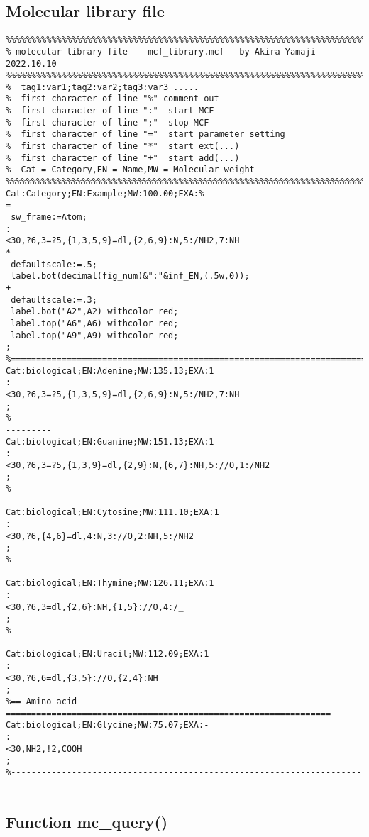 \documentclass[a4paper]{article}
\begin{document}
\subsection{Molecular library file}
\begin{verbatim}
%%%%%%%%%%%%%%%%%%%%%%%%%%%%%%%%%%%%%%%%%%%%%%%%%%%%%%%%%%%%%%%%%%%%%%%%%%%%%%%
% molecular library file    mcf_library.mcf   by Akira Yamaji   2022.10.10
%%%%%%%%%%%%%%%%%%%%%%%%%%%%%%%%%%%%%%%%%%%%%%%%%%%%%%%%%%%%%%%%%%%%%%%%%%%%%%%
%  tag1:var1;tag2:var2;tag3:var3 .....
%  first character of line "%" comment out
%  first character of line ":"  start MCF
%  first character of line ";"  stop MCF
%  first character of line "="  start parameter setting
%  first character of line "*"  start ext(...)
%  first character of line "+"  start add(...)
%  Cat = Category,EN = Name,MW = Molecular weight
%%%%%%%%%%%%%%%%%%%%%%%%%%%%%%%%%%%%%%%%%%%%%%%%%%%%%%%%%%%%%%%%%%%%%%%%%%%%%%%
Cat:Category;EN:Example;MW:100.00;EXA:%
=
 sw_frame:=Atom;
:
<30,?6,3=?5,{1,3,5,9}=dl,{2,6,9}:N,5:/NH2,7:NH
*
 defaultscale:=.5;
 label.bot(decimal(fig_num)&":"&inf_EN,(.5w,0));
+
 defaultscale:=.3;
 label.bot("A2",A2) withcolor red;
 label.top("A6",A6) withcolor red;
 label.top("A9",A9) withcolor red;
;
%==============================================================================
Cat:biological;EN:Adenine;MW:135.13;EXA:1
:
<30,?6,3=?5,{1,3,5,9}=dl,{2,6,9}:N,5:/NH2,7:NH
;
%------------------------------------------------------------------------------
Cat:biological;EN:Guanine;MW:151.13;EXA:1
:
<30,?6,3=?5,{1,3,9}=dl,{2,9}:N,{6,7}:NH,5://O,1:/NH2
;
%------------------------------------------------------------------------------
Cat:biological;EN:Cytosine;MW:111.10;EXA:1
:
<30,?6,{4,6}=dl,4:N,3://O,2:NH,5:/NH2
;
%------------------------------------------------------------------------------
Cat:biological;EN:Thymine;MW:126.11;EXA:1
:
<30,?6,3=dl,{2,6}:NH,{1,5}://O,4:/_
;
%------------------------------------------------------------------------------
Cat:biological;EN:Uracil;MW:112.09;EXA:1
:
<30,?6,6=dl,{3,5}://O,{2,4}:NH
;
%== Amino acid ================================================================
Cat:biological;EN:Glycine;MW:75.07;EXA:-
:
<30,NH2,!2,COOH
;
%------------------------------------------------------------------------------
\end{verbatim}
\noindent%
\newpage
\subsection{Function mc\_query()}
%
\end{document}
